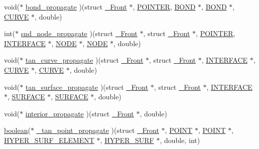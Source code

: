 \begin{DoxyCompactItemize}
\item 
void($\ast$ \hyperlink{struct___front_adc0a185545fde2d025a4791af2d2206e}{bond\+\_\+propagate} )(struct \hyperlink{struct___front}{\+\_\+\+Front} $\ast$, \hyperlink{cdecs_8h_ae51a81000f343b8ec43bca1f6a723d7b}{P\+O\+I\+N\+T\+ER}, \hyperlink{int_8h_a13b5a9ccac0e6d04386af2ef62582540}{B\+O\+ND} $\ast$, \hyperlink{int_8h_a13b5a9ccac0e6d04386af2ef62582540}{B\+O\+ND} $\ast$, \hyperlink{int_8h_a4c1c272bef898dbaa20b055af85cd685}{C\+U\+R\+VE} $\ast$, double)
\item 
int($\ast$ \hyperlink{struct___front_aa4eb27e8069ffbfc04a06ad00cd551e8}{snd\+\_\+node\+\_\+propagate} )(struct \hyperlink{struct___front}{\+\_\+\+Front} $\ast$, struct \hyperlink{struct___front}{\+\_\+\+Front} $\ast$, \hyperlink{cdecs_8h_ae51a81000f343b8ec43bca1f6a723d7b}{P\+O\+I\+N\+T\+ER}, \hyperlink{int_8h_a58cf562d0d320a608294b7310ea167dc}{I\+N\+T\+E\+R\+F\+A\+CE} $\ast$, \hyperlink{int_8h_a65acc517559b106aa8e5fe339247ddcd}{N\+O\+DE} $\ast$, \hyperlink{int_8h_a65acc517559b106aa8e5fe339247ddcd}{N\+O\+DE} $\ast$, double)
\item 
void($\ast$ \hyperlink{struct___front_a920b52cf8787c046e04477a2ea696b1e}{tan\+\_\+curve\+\_\+propagate} )(struct \hyperlink{struct___front}{\+\_\+\+Front} $\ast$, struct \hyperlink{struct___front}{\+\_\+\+Front} $\ast$, \hyperlink{int_8h_a58cf562d0d320a608294b7310ea167dc}{I\+N\+T\+E\+R\+F\+A\+CE} $\ast$, \hyperlink{int_8h_a4c1c272bef898dbaa20b055af85cd685}{C\+U\+R\+VE} $\ast$, \hyperlink{int_8h_a4c1c272bef898dbaa20b055af85cd685}{C\+U\+R\+VE} $\ast$, double)
\item 
void($\ast$ \hyperlink{struct___front_a35c5c3dfdd40c1d1675eb9b919c066cb}{tan\+\_\+surface\+\_\+propagate} )(struct \hyperlink{struct___front}{\+\_\+\+Front} $\ast$, struct \hyperlink{struct___front}{\+\_\+\+Front} $\ast$, \hyperlink{int_8h_a58cf562d0d320a608294b7310ea167dc}{I\+N\+T\+E\+R\+F\+A\+CE} $\ast$, \hyperlink{int_8h_a1520d8870b5eafd76bd401aecb121ffd}{S\+U\+R\+F\+A\+CE} $\ast$, \hyperlink{int_8h_a1520d8870b5eafd76bd401aecb121ffd}{S\+U\+R\+F\+A\+CE} $\ast$, double)
\item 
void($\ast$ \hyperlink{struct___front_a3dc80df04161736b2a6600ee17dbb00f}{interior\+\_\+propagate} )(struct \hyperlink{struct___front}{\+\_\+\+Front} $\ast$, double)
\item 
\hyperlink{cdecs_8h_ad048433382a936258fb49e2ec4f148e1}{boolean}($\ast$ \hyperlink{struct___front_acfe36580b8246c1598bed25bd74d9970}{\+\_\+tan\+\_\+point\+\_\+propagate} )(struct \hyperlink{struct___front}{\+\_\+\+Front} $\ast$, \hyperlink{int_8h_a3a87c5c9d0146e30a4bf720f701e5a63}{P\+O\+I\+NT} $\ast$, \hyperlink{int_8h_a3a87c5c9d0146e30a4bf720f701e5a63}{P\+O\+I\+NT} $\ast$, \hyperlink{int_8h_a17e21ae7174174d7a55516f8c9a8f12f}{H\+Y\+P\+E\+R\+\_\+\+S\+U\+R\+F\+\_\+\+E\+L\+E\+M\+E\+NT} $\ast$, \hyperlink{int_8h_acef50fa4757ce0d3f75c97fab5a175bc}{H\+Y\+P\+E\+R\+\_\+\+S\+U\+RF} $\ast$, double, int)

\end{DoxyCompactItemize}
